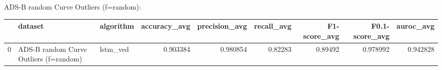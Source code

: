 ADS-B random Curve Outliers (f=random):

\begin{tabular}{rllrrrrrr}
\hline
    & dataset                                & algorithm   &   accuracy\_avg &   precision\_avg &   recall\_avg &   F1-score\_avg &   F0.1-score\_avg &   auroc\_avg \\
\hline
  0 & ADS-B random Curve Outliers (f=random) & lstm\_ved    &       0.903384 &        0.980854 &      0.82283 &        0.89492 &         0.978992 &    0.942828 \\
\hline
\end{tabular}

